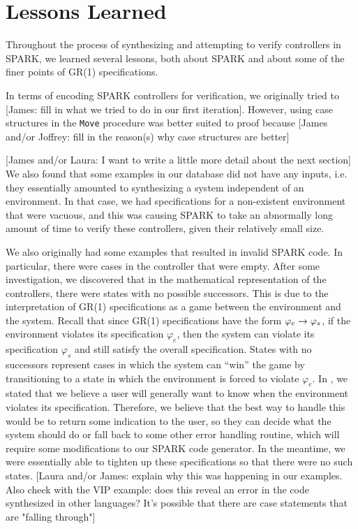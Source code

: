 \documentclass[runningheads]{llncs}
\begin{document}
\section{Lessons Learned}
\label{sec:lessonsLearned}

Throughout the process of synthesizing and attempting to verify controllers in SPARK, we learned several lessons, 
both about SPARK and about some of the finer points of GR(1) specifications.

In terms of encoding SPARK controllers for verification, we originally tried to 
[James: fill in what we tried to do in our first iteration].
However, using case structures in the \lstinline{Move} procedure was better suited to proof because
[James and/or Joffrey: fill in the reason(s) why case structures are better]

[James and/or Laura: I want to write a little more detail about the next section]
We also found that some examples in our database did not have any inputs, i.e. they essentially amounted to synthesizing a system independent of an environment. 
In that case, we had specifications for a non-existent environment that were vacuous, 
and this was causing SPARK to take an abnormally long amount of time to verify these controllers, given their relatively small size.

We also originally had some examples that resulted in invalid SPARK code. 
In particular, there were cases in the controller that were empty. 
After some investigation, we discovered that in the mathematical representation of the controllers, there were states with no possible successors. 
This is due to the interpretation of GR(1) specifications as a game between the environment and the system. 
Recall that since GR(1) specifications have the form $\varphi_e \rightarrow \varphi_s$, if the environment violates its specification $\varphi_e$, then the system 
can violate its specification $\varphi_s$ and still satisfy the overall specification. 
States with no successors represent cases in which the system can ``win'' the game by transitioning to a state in which the environment is forced to violate $\varphi_e$. 
In , we stated that we believe a user will generally want to know when the environment violates its specification. 
Therefore, we believe that the best way to handle this would be to return some indication to the user, so they can decide what the system should do or fall back to some other error handling routine, 
which will require some modifications to our SPARK code generator. 
In the meantime, we were essentially able to tighten up these specifications so that there were no such states.
[Laura and/or James: explain why this was happening in our examples. Also check with the VIP example: does this reveal an error in the code synthesized in other languages? It's possible that there are case statements that are "falling through"]
\end{document}
